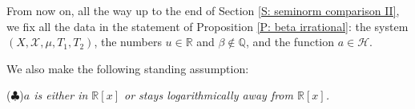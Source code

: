 \documentclass[11pt]{amsart}
\theoremstyle{definition}
\DeclareMathOperator*{\E}{\mathbb{E}}
\newcommand{\Q}{{\mathbb Q}}
\newcommand{\R}{{\mathbb R}}
\newcommand{\CH}{{\mathcal H}}
\newcommand{\CX}{{\mathcal X}}
\newcommand{\be}{{\mathbf{e}}}
\newcommand{\norm}[1]{\left\Vert #1\right\Vert}
\newcommand{\nnorm}[1]{\lvert\!|\!| #1|\!|\!\rvert}
\newcommand{\1}{{\mathbf{1}}}
\newcommand{\floor}[1]{{\left \lfloor #1 \right \rfloor}}
\begin{document}
 


From now on, all the way up to the end of Section \ref{S: seminorm comparison II}, we fix all the data in the statement of Proposition \ref{P: beta irrational}: the system $(X, \CX, \mu, T_1, T_2)$, the numbers $u\in\R$ and $\beta\notin\Q$, and the  {function} $a\in\CH$. {We also make the following standing assumption:

\smallskip
($\clubsuit$)\quad \emph{$a$ is either in $\R[x]$ or stays logarithmically away from $\R[x]$.}
\smallskip}
\end{document}
